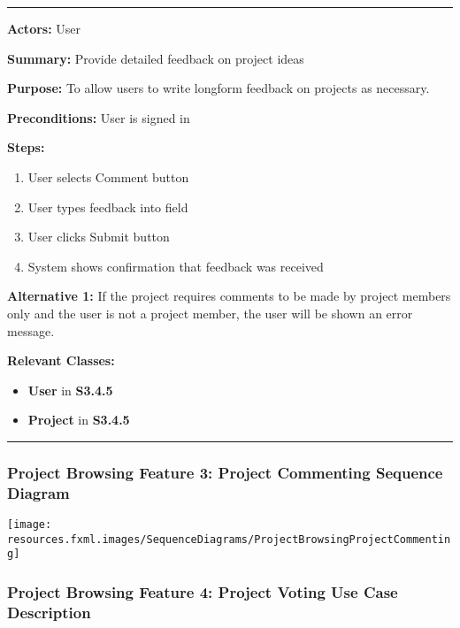 \documentclass[twoside,letterpaper]{article}
\begin{document}
\vspace{2pt}
\hrule
\vspace{8pt}
\textbf{Actors:} User \newline

\noindent\textbf{Summary:} Provide detailed feedback on project ideas  \newline

\noindent\textbf{Purpose:} To allow users to write longform feedback on projects as necessary. \newline

\noindent\textbf{Preconditions:} User is signed in \newline

\noindent\textbf{Steps:} \begin{enumerate}
	\item User selects Comment button
	\item User types feedback into field
	\item User clicks Submit button
	\item System shows confirmation that feedback was received
\end{enumerate}
\noindent\textbf{Alternative 1:} If the project requires comments to be made by project members only and the user is not a project member, the user will be shown an error message. \newline


\noindent\textbf{Relevant Classes:}
\begin{itemize}
	\item \textbf{User} in \textbf{S3.4.5}
	\item \textbf{Project} in \textbf{S3.4.5}
\end{itemize}
\vspace{8pt}
\hrule
\newpage
\subsubsection[Project Browsing Feature 3: Project Commenting Sequence Diagram]{\rmfamily\bfseries\color{black}
	Project Browsing Feature 3: Project Commenting Sequence Diagram}
\hypertarget{RefHeading22059017292}{}

\bigskip

\texttt{[image: resources.fxml.images/SequenceDiagrams/ProjectBrowsingProjectCommenting]}

\newpage
\subsubsection[Project Browsing Feature 4: Project Voting Use Case Description]{\rmfamily\bfseries\color{black}
Project Browsing Feature 4: Project Voting Use Case Description}
\hypertarget{RefHeading22059017292}{}
\end{document}
